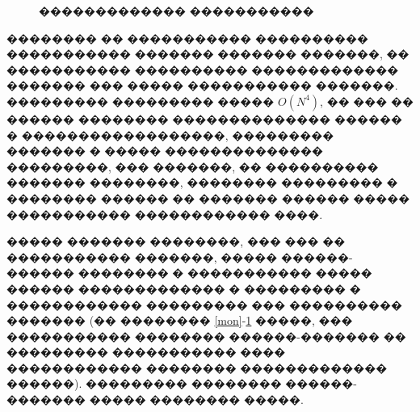 \documentclass[a4paper]{article}
\begin{document}
\begin{figure}[h!]
  \noindent{}
  \caption{������������� �����������}
  \label{log}
\end{figure}


�������� �� ����������� ���������� ����������� ������� ������� �������, �� ����������� ���������� ������������� ������� ��� ����� ����������� �������. ��������� ��������� ����� $O(N^4)$, �� ��� �� ������ �������� �������������� ������ � ������������������, ��������� ������� � ����� �������������� ���������, ��� �������, �� ���������� ������� ��������, �������� ��������� � �������� ������ �� ������� ������ ����� ����������� ������������ ����.

����� ������� ��������, ��� ��� �� ����������� �������, ����� ������-������ �������� � ����������� ����� ������ ������������� � ��������� � ������������ ��������� ��� ���������� ������� (�� �������� \ref{mon}-\ref{log} �����, ��� ����������� �������� ������-������� �� ��������� ����������� ���� ������������ �������� ������������� ������). ��������� �������� ������-������� ����� �������� �����.
\end{document}
